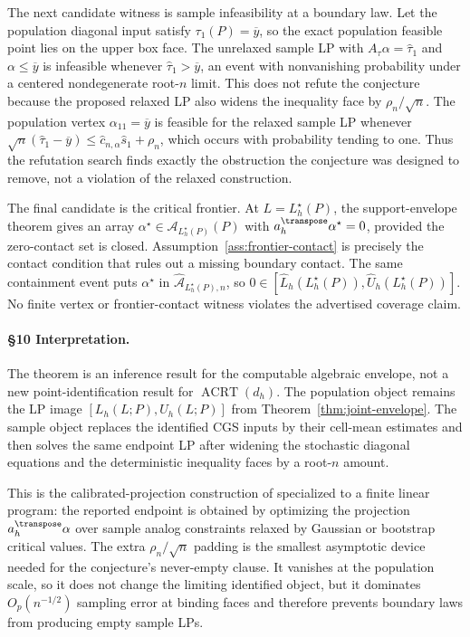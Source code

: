 The next candidate witness is sample infeasibility at a boundary law.  Let the
population diagonal input satisfy \(\tau_1(P)=\overline y\), so the exact
population feasible point lies on the upper box face.  The unrelaxed sample
LP with \(A_\tau\alpha=\widehat\tau_1\) and \(\alpha\le\overline y\) is
infeasible whenever \(\widehat\tau_1>\overline y\), an event with nonvanishing
probability under a centered nondegenerate root-\(n\) limit.  This does not
refute the conjecture because the proposed relaxed LP also widens the
inequality face by \(\rho_n/\sqrt n\).  The population vertex
\(\alpha_{11}=\overline y\) is feasible for the relaxed sample LP whenever
\(\sqrt n(\widehat\tau_1-\overline y)\le \widehat c_{n,\alpha}\widehat s_1+\rho_n\),
which occurs with probability tending to one.  Thus the refutation search
finds exactly the obstruction the conjecture was designed to remove, not a
violation of the relaxed construction.

The final candidate is the critical frontier.  At \(L=L_h^\star(P)\), the
support-envelope theorem gives an array \(\alpha^\star\in\mathcal A_{L_h^\star(P)}(P)\)
with \(a_h^\transpose\alpha^\star=0\), provided the zero-contact set is closed.
Assumption~\ref{ass:frontier-contact} is precisely the contact condition that
rules out a missing boundary contact.  The same containment event puts
\(\alpha^\star\) in \(\widehat{\mathcal A}_{L_h^\star(P),n}\), so
\(0\in[\widehat L_h(L_h^\star(P)),\widehat U_h(L_h^\star(P))]\).  No finite
vertex or frontier-contact witness violates the advertised coverage claim.

\paragraph{\S10 Interpretation.}
The theorem is an inference result for the computable algebraic envelope, not
a new point-identification result for \(\operatorname{ACRT}(d_h)\).  The
population object remains the LP image
\([L_h(L;P),U_h(L;P)]\) from Theorem~\ref{thm:joint-envelope}.  The sample
object replaces the identified CGS inputs by their cell-mean estimates and
then solves the same endpoint LP after widening the stochastic diagonal
equations and the deterministic inequality faces by a root-\(n\) amount.

This is the calibrated-projection construction of
\cite{KaidoMolinariStoye2019} specialized to a finite linear program: the
reported endpoint is obtained by optimizing the projection
\(a_h^\transpose\alpha\) over sample analog constraints relaxed by Gaussian or
bootstrap critical values.  The extra \(\rho_n/\sqrt n\) padding is the
smallest asymptotic device needed for the conjecture's never-empty clause.
It vanishes at the population scale, so it does not change the limiting
identified object, but it dominates \(O_p(n^{-1/2})\) sampling error at
binding faces and therefore prevents boundary laws from producing empty
sample LPs.

